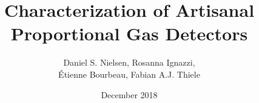 \documentclass[twocolumn,a4paper]{article}
\title{Characterization of Artisanal Proportional Gas Detectors }
\author{Daniel S. Nielsen, Rosanna Ignazzi, \\Étienne Bourbeau, Fabian A.J. Thiele}
\date{December 2018}
\begin{document}

\maketitle



\newpage

\tableofcontents

\clearpage





	








\FloatBarrier
\cleardoublepage
\appendix





\printbibliography
\end{document}
